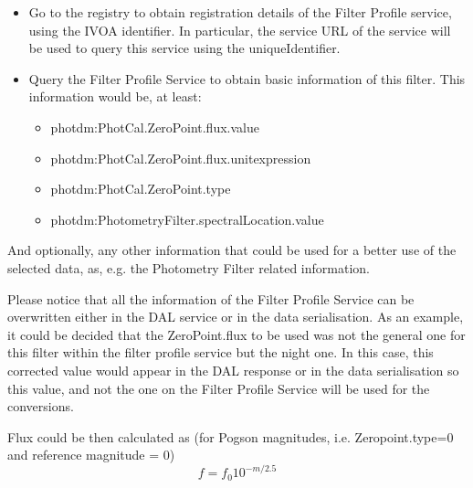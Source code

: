 \documentclass[11pt,a4paper]{ivoa}
\begin{document}
\begin{itemize}
	\item{Go to the registry to obtain registration details of the Filter Profile service,
	using the IVOA identifier. In particular, the service URL of the service will be used
	to query this service using the uniqueIdentifier.\par}

	\item{Query the Filter Profile Service to obtain basic information of this filter. This
	information would be, at least:\par}

\begin{itemize}
	\item photdm:PhotCal.ZeroPoint.flux.value\par

	\item photdm:PhotCal.ZeroPoint.flux.unitexpression\par

	\item photdm:PhotCal.ZeroPoint.type\par

	\item photdm:PhotometryFilter.spectralLocation.value
\end{itemize}
\end{itemize}\par

And optionally, any other information that could be used for a better use of the selected
data, as, e.g. the Photometry Filter related information.
\par

Please notice that all the information of the Filter Profile Service can be overwritten
either in the DAL service or in the data serialisation. As an example, it could be
decided that the ZeroPoint.flux to be used was not the general one for this filter
within the filter profile service but the night one. In this case, this corrected
value would appear in the DAL response or in the data serialisation so this value,
and not the one on the Filter Profile Service will be used for the conversions.
\par

Flux could be then calculated as (for Pogson magnitudes, i.e. Zeropoint.type=0 and
reference magnitude = 0)
\begin{equation} \label{eq:33}
f = f_0 10^{-m/2.5}
\end{equation}
\end{document}
